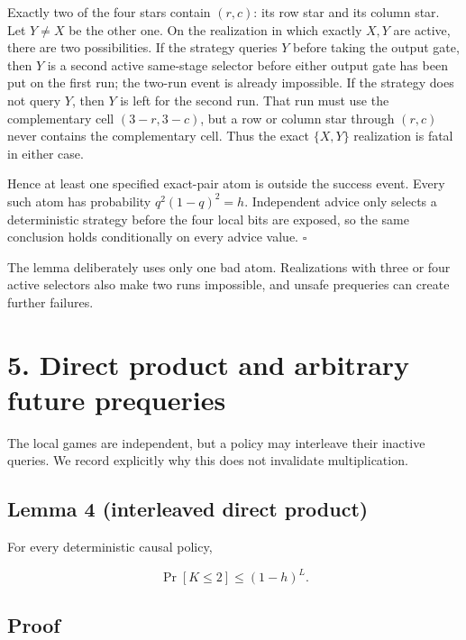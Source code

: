 \documentclass[11pt,a4paper]{article}
\begin{document}
Exactly two of the four stars contain \((r,c)\): its row star and its column star.  Let \(Y\ne X\) be the other one.  On the realization in which exactly \(X,Y\) are active, there are two possibilities.  If the strategy queries \(Y\) before taking the output gate, then \(Y\) is a second active same-stage selector before either output gate has been put on the first run; the two-run event is already impossible.  If the strategy does not query \(Y\), then \(Y\) is left for the second run.  That run must use the complementary cell \((3-r,3-c)\), but a row or column star through \((r,c)\) never contains the complementary cell.  Thus the exact \(\{X,Y\}\) realization is fatal in either case.


Hence at least one specified exact-pair atom is outside the success event. Every such atom has probability \(q^2(1-q)^2=h\).  Independent advice only selects a deterministic strategy before the four local bits are exposed, so the same conclusion holds conditionally on every advice value. \(\square\)


The lemma deliberately uses only one bad atom.  Realizations with three or four active selectors also make two runs impossible, and unsafe prequeries can create further failures.


\section*{5. Direct product and arbitrary future prequeries}

The local games are independent, but a policy may interleave their inactive queries.  We record explicitly why this does not invalidate multiplication.


\subsection*{Lemma 4 (interleaved direct product)}

For every deterministic causal policy,


\begin{equation}
                         \Pr[K\le2]\le(1-h)^L.
\tag{5.1}
\end{equation}

\subsection*{Proof}
\end{document}
